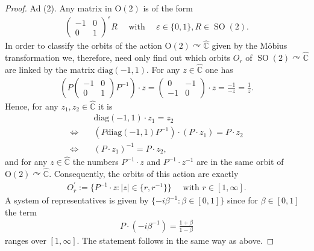 \documentclass{amsart}
\newcommand{\C}{\mathbb{C}}
\DeclareMathOperator{\SO}{SO}
\begin{document}
\begin{proof}
    Ad (2). Any matrix in $\mathrm{O}(2)$ is of the form
    \begin{align*}
        \begin{pmatrix}
            -1 & 0 \\
            0 & 1
        \end{pmatrix}^\varepsilon R
        \quad \text{ with } \quad 
        \varepsilon \in \{0,1\}, R \in \SO(2).
    \end{align*}
    In order to classify the orbits of the action $\mathrm{O}(2) \curvearrowright \hat{\C}$ given by the M\"obius transformation we, therefore, need only find out which orbits $O_r$ of $\SO(2) \curvearrowright \hat{\C}$ are linked by the matrix $\mathrm{diag}(-1, 1)$. For any $z \in \hat{\C}$ one has 
    \begin{align*}
        \left(P \begin{pmatrix}
            -1 & 0 \\
            0  & 1
        \end{pmatrix} P^{-1}\right) \cdot z
            = \begin{pmatrix}
                0 & -1 \\
                -1 & 0
            \end{pmatrix}
            \cdot z = \frac{-1}{-z} = \frac{1}{z}.
    \end{align*}
    Hence, for any $z_1, z_2 \in \hat{\C}$ it is
    \begin{align*}
        &\mathrm{diag}(-1, 1) \cdot z_1 = z_2 \\
        \Leftrightarrow \quad & \left(P \mathrm{diag}(-1, 1) P^{-1}\right) \cdot (P \cdot z_1) = P \cdot z_2 \\
        \Leftrightarrow \quad & (P \cdot z_1)^{-1} = P \cdot z_2,
    \end{align*}
    and for any $z \in \hat{\C}$ the numbers $P^{-1} \cdot z$ and $P^{-1} \cdot z^{-1}$ are in the same orbit of $\mathrm{O}(2) \curvearrowright \hat{\C}$. Consequently, the orbits of this action are exactly
    \begin{align*}
        O^\prime_r := \{P^{-1} \cdot z: |z| \in \{r, r^{-1}\}\} \quad \text{ with } r \in [1,\infty].
    \end{align*}
    A system of representatives is given by $\{-i \beta^{-1}: \beta \in [0,1]\}$ since for $\beta \in [0,1]$ the term
    \begin{align*}
        P \cdot (-i \beta^{-1}) = \frac{1+\beta}{1-\beta}
    \end{align*}
    ranges over $[1, \infty]$. The statement follows in the same way as above.
\end{proof}
\end{document}
